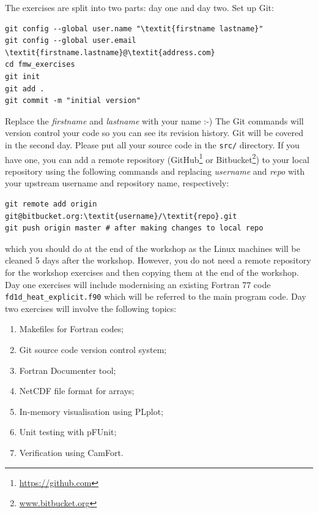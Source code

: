 \documentclass[12pt]{article}
\begin{document}
The exercises are split into two parts: day one and day two. Set up Git:
\begin{Verbatim}[commandchars=\\\{\}]
git config --global user.name "\textit{firstname lastname}"
git config --global user.email \textit{firstname.lastname}@\textit{address.com}
cd fmw_exercises
git init
git add .
git commit -m "initial version"
\end{Verbatim}
Replace the \textit{firstname} and \textit{lastname} with your name :-) The Git commands
will version control your code so you can see its revision history. Git will
be covered in the second day. Please put all your source code in the \texttt{src/}
directory. If you have one, you can add a remote repository (GitHub\footnote{\url{https://github.com}}
or Bitbucket\footnote{\url{www.bitbucket.org}}) to your local repository
using the following commands and replacing \textit{username} and \textit{repo} with your upstream username
and repository name, respectively:
\begin{Verbatim}[commandchars=\\\{\}]
git remote add origin git@bitbucket.org:\textit{username}/\textit{repo}.git
git push origin master # after making changes to local repo
\end{Verbatim}
which you should do at the end of the workshop as the Linux machines will be cleaned 5 days after the workshop.
However, you do not need a remote repository for the workshop exercises and
then copying them at the end of the workshop.
Day one exercises will include modernising an existing Fortran 77 code \texttt{fd1d\_heat\_explicit.f90} which
will be referred to the main program code. Day two exercises will involve the following topics:
\begin{enumerate}
\item Makefiles for Fortran codes;
\item Git source code version control system;
\item Fortran Documenter tool;
\item NetCDF file format for arrays;
\item In-memory visualisation using PLplot;
\item Unit testing with pFUnit;
\item Verification using CamFort.
\end{enumerate}
\newpage
\end{document}
